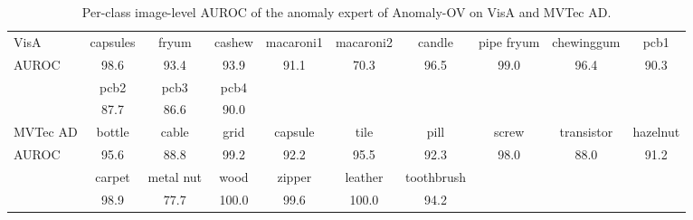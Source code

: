 \begin{table*}
\small
\centering
\begin{tabular}{l|ccccccccc}
\toprule
VisA     & capsules & fryum      & cashew & macaroni1 & macaroni2 & candle     & pipe fryum & chewinggum & pcb1     \\ 
AUROC    & 98.6     & 93.4       & 93.9   & 91.1      & 70.3      & 96.5       & 99.0       & 96.4       & 90.3     \\
         & pcb2     & pcb3       & pcb4   &           &           &            &            &            &           \\
         & 87.7     & 86.6       & 90.0   &           &           &            &            &            &           \\
\hline
MVTec AD & bottle   & cable      & grid   & capsule   & tile      & pill       & screw      & transistor & hazelnut \\
AUROC    & 95.6     & 88.8       & 99.2   & 92.2      & 95.5      & 92.3       & 98.0       & 88.0       & 91.2     \\
         & carpet   & metal nut  & wood   & zipper    & leather   & toothbrush &            &            &          \\
         & 98.9     & 77.7       & 100.0  & 99.6      & 100.0     & 94.2       &            &            &          \\
\bottomrule
\end{tabular}
\caption{Per-class image-level AUROC of the anomaly expert of Anomaly-OV on VisA and MVTec AD.}
\label{Tab:mvtec_visa}
\vspace{-3mm}
\end{table*}